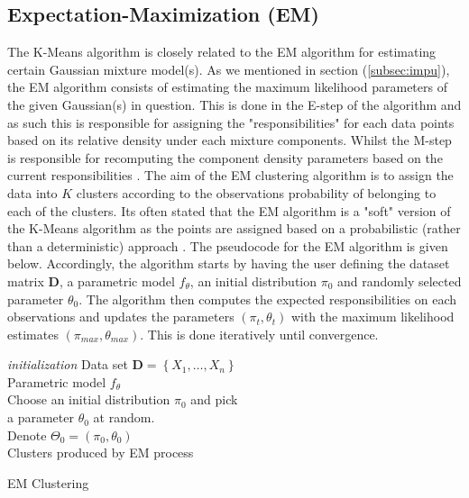 \documentclass[../thesis.tex]{subfiles}
\begin{document}
\subsection{Expectation-Maximization (EM)}
\label{subsec:em}

\noindent The K-Means algorithm is closely related to the EM algorithm \citep{dempster1977maximum} for estimating certain Gaussian mixture model(s). As we mentioned in section (\ref{subsec:impu}), the EM algorithm consists of estimating the maximum likelihood parameters of the given Gaussian(s) in question. This is done in the E-step of the algorithm and as such this is responsible for assigning the "responsibilities" for each 
data points based on its relative density under each mixture components. Whilst the M-step is responsible for recomputing the component density parameters based on the current responsibilities \citep{friedman2009elements}. The aim of the EM clustering algorithm is to assign the data into $K$ clusters according to the observations probability of belonging to each of the clusters. Its often stated that the EM algorithm is a "soft" version of the K-Means algorithm as the points are assigned based on a probabilistic (rather than a deterministic) approach \citep{james2013introduction}. The pseudocode for the EM algorithm is given below. Accordingly, the algorithm starts by having the user defining the dataset matrix $\mathbf{D}$, a parametric model $f_\theta$, an initial distribution $\pi_0$ and randomly selected parameter $\theta_0$. The algorithm then computes the expected responsibilities on each observations and updates the parameters $(\pi_t, \theta_t)$ with the maximum likelihood estimates $(\pi_{max}, \theta_{max})$. This is done iteratively until convergence.
\begin{algorithm}[H]{
\SetAlgoLined
\textit{initialization}\;
    \hspace*{0,5cm}Data set $\mathbf{D} = \left \{X_1, \hdots, X_n \right\}$\\
    \hspace*{0,5cm}Parametric model $f_\theta$\\
    \hspace*{0,5cm}Choose an initial distribution $\pi_0$ and pick\\ \hspace*{0,5cm}a parameter $\theta_0$ at random.\\
    \hspace*{0,5cm}Denote $\Theta_0 = (\pi_0, \theta_0)$\\
    \Return Clusters produced by EM process
}
\caption{EM Clustering}
\end{algorithm}
\end{document}
